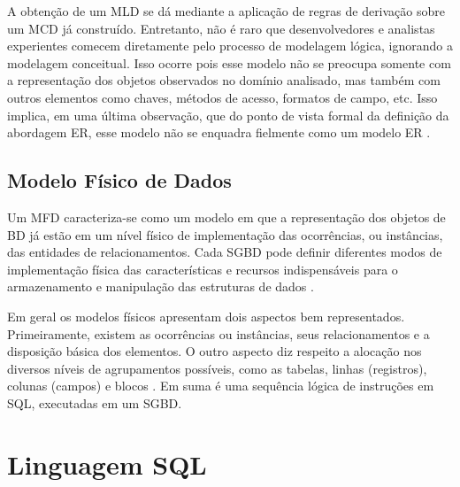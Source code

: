 A obtenção de um \ac{MLD} se dá mediante a aplicação de regras de derivação sobre um \ac{MCD} já construído. 
Entretanto, não é raro que desenvolvedores e analistas experientes comecem diretamente pelo processo de modelagem lógica, ignorando a modelagem conceitual. 
Isso ocorre pois esse modelo não se preocupa somente com a representação dos objetos observados no domínio analisado, mas também com outros elementos como chaves, métodos de acesso, formatos de campo, etc. 
Isso implica, em uma última observação, que do ponto de vista formal da definição da abordagem \ac{ER}, esse modelo não se enquadra fielmente como um modelo \ac{ER} \cite{West:2011}.

    \subsection{Modelo Físico de Dados} \label{ssec:ModelFisico}

Um \ac{MFD} caracteriza-se como um modelo em que a representação dos objetos de \ac{BD} já estão em um nível físico de implementação das ocorrências, ou instâncias, das entidades de relacionamentos. 
Cada \ac{SGBD} pode definir diferentes modos de implementação física das características e recursos indispensáveis para o armazenamento e manipulação das estruturas de dados \cite{Cougo:2013}.

Em geral os modelos físicos apresentam dois aspectos bem representados. 
Primeiramente, existem as ocorrências ou instâncias, seus relacionamentos e a disposição básica dos elementos. 
O outro aspecto diz respeito a alocação nos diversos níveis de agrupamentos possíveis, como as tabelas, linhas (registros), colunas (campos) e blocos \cite{West:2011}.
Em suma é uma sequência lógica de instruções em \ac{SQL}, executadas em um \ac{SGBD}.

\section{Linguagem SQL} \label{sec:LinguagemSQL}

